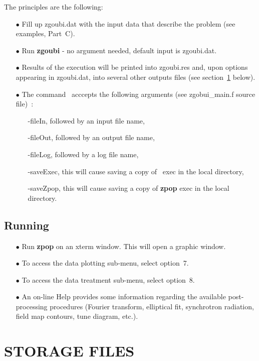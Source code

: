 The principles are the following:
\begin{itemize}
\item[$\bullet$] Fill up zgoubi.dat    with the input data that describe the 
problem (see examples, Part~C). 
\item[$\bullet$] Run  \textbf{zgoubi} - no argument needed, default input is zgoubi.dat. 
\item[$\bullet$] Results of the execution will be printed into  
zgoubi.res  and, upon options appearing in zgoubi.dat,
 into several other outputs files (see section~\ref{secD-3} below).  
\item[$\bullet$] The command \zgou\ acccepts the following arguments (see zgobui\_main.f source file)~: 
\begin{itemize}
\item[] -fileIn, followed by an input file name, 
\item[] -fileOut, followed by an output file name,
\item[] -fileLog, followed by a log file name,
\item[] -saveExec, this will cause saving a copy of \zgou\ exec in the local directory,
\item[] -saveZpop, this will cause saving a copy of \textbf{zpop} exec in the local directory. 
\end{itemize}
\end{itemize}

\subsection{Running \zpop}  

\begin{itemize}
\item[$\bullet$] Run \textbf{zpop} on an xterm window. This will open a 
graphic window. 
\item[$\bullet$] To access the data plotting sub-menu, select option~7. 
\item[$\bullet$] To access the data treatment sub-menu, select option~8. 
\item[$\bullet$] An on-line Help provides some information 
regarding the available post-processing procedures (Fourier transform, elliptical fit, synchrotron 
radiation, field map contours, tune diagram, etc.).
\end{itemize}

\section{STORAGE FILES} \label{secD-3}

